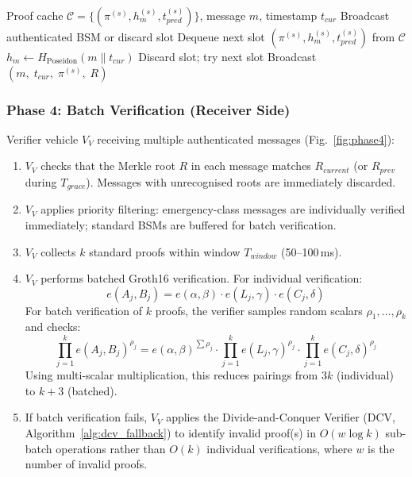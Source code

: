 \begin{algorithm}[t]
\caption{Online Proof Broadcast (Phase 3)}
\label{alg:online_proof}
\begin{algorithmic}[1]
\REQUIRE Proof cache $\mathcal{C} = \{(\pi^{(s)}, h^{(s)}_m, t^{(s)}_{\mathit{pred}})\}$, message $m$, timestamp $t_{\mathit{cur}}$
\ENSURE Broadcast authenticated BSM or discard slot
\STATE Dequeue next slot $(\pi^{(s)}, h^{(s)}_m, t^{(s)}_{\mathit{pred}})$ from $\mathcal{C}$
    \hfill {}
\STATE $h_m \leftarrow H_{\mathrm{Poseidon}}(m \| t_{\mathit{cur}})$
    \hfill {}
    \STATE Discard slot; try next slot \hfill {}
\ENDIF
\STATE Broadcast $(m,\; t_{\mathit{cur}},\; \pi^{(s)},\; R)$
    \hfill {}
\end{algorithmic}
\end{algorithm}

\subsubsection{Phase 4: Batch Verification (Receiver Side)}
Verifier vehicle $V_V$ receiving multiple authenticated messages (Fig.~\ref{fig:phase4}):
\begin{enumerate}
    \item $V_V$ checks that the Merkle root $R$ in each message matches
    $R_{current}$ (or $R_{prev}$ during $T_{grace}$). Messages with unrecognised
    roots are immediately discarded.
    \item $V_V$ applies priority filtering: emergency-class messages are
    individually verified immediately; standard BSMs are buffered for batch
    verification.
    \item $V_V$ collects $k$ standard proofs within window $T_{window}$
    (50--100\,ms).
    \item $V_V$ performs batched Groth16 verification. For individual verification:
    \begin{equation}
        e(A_j, B_j) = e(\alpha, \beta) \cdot e(L_j, \gamma) \cdot e(C_j, \delta)
    \end{equation}
    For batch verification of $k$ proofs, the verifier samples random scalars
    $\rho_1, \ldots, \rho_k$ and checks:
    \begin{equation}
        \prod_{j=1}^{k} e(A_j, B_j)^{\rho_j} = e(\alpha, \beta)^{\sum \rho_j}
        \cdot \prod_{j=1}^{k} e(L_j, \gamma)^{\rho_j}
        \cdot \prod_{j=1}^{k} e(C_j, \delta)^{\rho_j}
    \end{equation}
    Using multi-scalar multiplication, this reduces pairings from $3k$
    (individual) to $k+3$ (batched).
    \item If batch verification fails, $V_V$ applies the Divide-and-Conquer
    Verifier (DCV, Algorithm~\ref{alg:dcv_fallback}) to identify invalid
    proof(s) in $O(w \log k)$ sub-batch operations rather than $O(k)$ individual
    verifications, where $w$ is the number of invalid proofs.
\end{enumerate}

